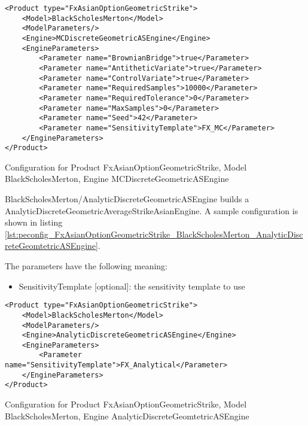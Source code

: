 \begin{longlisting}
\begin{verbatim}
<Product type="FxAsianOptionGeometricStrike">
    <Model>BlackScholesMerton</Model>
    <ModelParameters/>
    <Engine>MCDiscreteGeometricASEngine</Engine>
    <EngineParameters>
        <Parameter name="BrownianBridge">true</Parameter>    
        <Parameter name="AntitheticVariate">true</Parameter>    
        <Parameter name="ControlVariate">true</Parameter>    
        <Parameter name="RequiredSamples">10000</Parameter>    
        <Parameter name="RequiredTolerance">0</Parameter>    
        <Parameter name="MaxSamples">0</Parameter>    
        <Parameter name="Seed">42</Parameter>    
        <Parameter name="SensitivityTemplate">FX_MC</Parameter>
    </EngineParameters>
</Product>
\end{verbatim}
\caption{Configuration for Product FxAsianOptionGeometricStrike, Model BlackScholesMerton, Engine MCDiscreteGeometricASEngine}
\label{lst:peconfig_FxAsianOptionGeometricStrike_BlackScholesMerton_MCDiscreteGeomtetricASEngine}
\end{longlisting}

BlackScholesMerton/AnalyticDiscreteGeometricASEngine builds a AnalyticDiscreteGeometricAverageStrikeAsianEngine. A sample
configuration is shown in listing
\ref{lst:peconfig_FxAsianOptionGeometricStrike_BlackScholesMerton_AnalyticDiscreteGeomtetricASEngine}.

The parameters have the following meaning:

\begin{itemize}
\item SensitivityTemplate [optional]: the sensitivity template to use 
\end{itemize}

\begin{longlisting}
\begin{verbatim}
<Product type="FxAsianOptionGeometricStrike">
    <Model>BlackScholesMerton</Model>
    <ModelParameters/>
    <Engine>AnalyticDiscreteGeometricASEngine</Engine>
    <EngineParameters>
        <Parameter name="SensitivityTemplate">FX_Analytical</Parameter>
    </EngineParameters>
</Product>
\end{verbatim}
\caption{Configuration for Product FxAsianOptionGeometricStrike, Model BlackScholesMerton, Engine AnalyticDiscreteGeomtetricASEngine}
\label{lst:peconfig_FxAsianOptionGeometricStrike_BlackScholesMerton_AnalyticDiscreteGeomtetricASEngine}
\end{longlisting}

